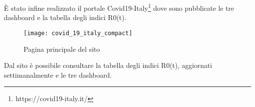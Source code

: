 
\noindent È stato infine realizzato il portale Covid19-Italy\footnote{https://covid19-italy.it/} dove sono pubblicate le tre dashboard e la tabella degli indici R0(t).


\begin{figure}[htp]
    \centering
    \texttt{[image: covid\_19\_italy\_compact]}
    \caption{Pagina principale del sito}
    \label{fig:home_page}
\end{figure}

\noindent Dal sito è possibile consultare la tabella degli indici R0(t), aggiornati settimanalmente e le tre dashboard.